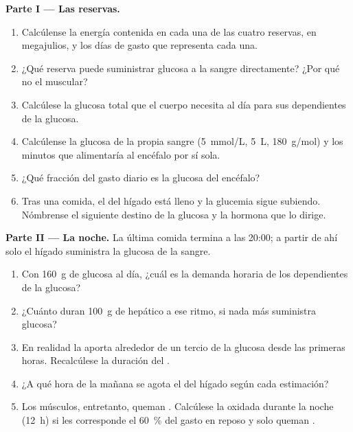 \begin{problem}
\medskip
\noindent\textbf{Parte I --- Las reservas.}
\begin{enumerate}
  \item Calcúlense la energía contenida en cada una de las cuatro reservas,
        en megajulios, y los días de gasto que representa cada una.
  \item ¿Qué reserva puede suministrar glucosa a la sangre directamente?
        ¿Por qué no el  muscular?
  \item Calcúlese la glucosa total que el cuerpo necesita al día para sus
         dependientes de la glucosa.
  \item Calcúlense la glucosa de la propia sangre (\qty{5}{mmol/L},
        \qty{5}{L}, \qty{180}{g/mol}) y los minutos que alimentaría al
        encéfalo por sí sola.
  \item ¿Qué fracción del gasto diario es la glucosa del encéfalo?
  \item Tras una comida, el  del hígado está lleno y la glucemia
        sigue subiendo. Nómbrense el siguiente destino de la glucosa y la
        hormona que lo dirige.
\end{enumerate}

\medskip
\noindent\textbf{Parte II --- La noche.}
La última comida termina a las 20:00; a partir de ahí solo el hígado
suministra la glucosa de la sangre.
\begin{enumerate}[resume]
  \item Con \qty{160}{g} de glucosa al día, ¿cuál es la demanda horaria de
        los  dependientes de la glucosa?
  \item ¿Cuánto duran \qty{100}{g} de  hepático a ese ritmo, si
        nada más suministra glucosa?
  \item En realidad la  aporta alrededor de un tercio de la
        glucosa desde las primeras horas. Recalcúlese la duración del
        .
  \item ¿A qué hora de la mañana se agota el  del hígado según
        cada estimación?
  \item Los músculos, entretanto, queman . Calcúlese la 
        oxidada durante la noche (\qty{12}{h}) si les corresponde el
        \qty{60}{\%} del gasto en reposo y solo queman .
\end{enumerate}


\end{problem}
